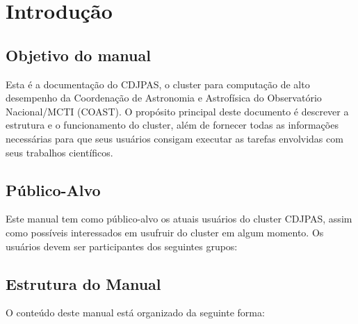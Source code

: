 \chapter{Introdução}
\label{chap:introducao}

\section{Objetivo do manual}
\label{sec:objetivo-do-manual}

Esta é a documentação do CDJPAS, o cluster para computação de alto desempenho da Coordenação de Astronomia e Astrofísica do Observatório Nacional/MCTI (COAST). O propósito principal deste documento é descrever a estrutura e o funcionamento do cluster, além de fornecer todas as informações necessárias para que seus usuários consigam executar as tarefas envolvidas com seus trabalhos científicos.

\section{Público-Alvo}
\label{sec:publico-alvo}

Este manual tem como público-alvo os atuais usuários do cluster CDJPAS, assim como possíveis interessados em usufruir do cluster em algum momento. Os usuários devem ser participantes dos seguintes grupos:

\section{Estrutura do Manual}
\label{sec:estrutura-do-manual}

O conteúdo deste manual está organizado da seguinte forma:

